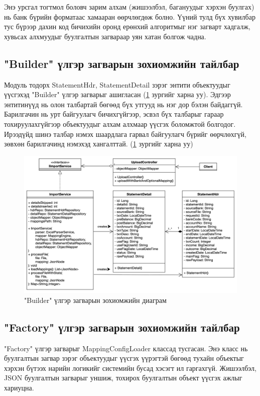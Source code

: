Энэ урсгал тогтмол боловч зарим алхам (жишээлбэл, багануудыг хэрхэн буулгах) нь банк бүрийн форматаас хамааран өөрчлөгдөж болно. Үүний тулд бүх хувилбар тус бүрээр дахин код бичихийн оронд ерөнхий алгоритмыг нэг загварт хадгалж, хувьсах алхмуудыг буулгалтын загвараар уян хатан болгож чадна. 

\subsection{"Builder" үлгэр загварын зохиомжийн тайлбар}

Модуль тодорх StatementHdr, StatementDetail зэрэг энтити объектуудыг үүсгэхэд "Builder" үлгэр загварыг ашигласан (\ref{fig:builder} зургийг харна уу). Эдгээр энтитинүүд нь олон талбартай бөгөөд бүх утгууд нь нэг дор бэлэн байдаггүй. Барилгачин нь урт байгуулагч бичихгүйгээр, эсвэл бүх талбарыг гараар тохируулахгүйгээр объектуудыг алхам алхмаар үүсгэх боломжтой болгодог. Ирээдүйд шинэ талбар нэмэх шаардлага гарвал байгуулагч бүрийг өөрчлөхгүй, зөвхөн барилгачинд нэмэхэд хангалттай. (\ref{fig:builder} зургийг харна уу)
\begin{figure}[H]
		\centering
		\includegraphics[width=15cm]{images/builder.png}
		\caption{"Builder" үлгэр загварын зохиомжийн диаграм}
		\label{fig:builder}
\end{figure}

\subsection{"Factory" үлгэр загварын зохиомжийн тайлбар}

"Factory" үлгэр загварыг MappingConfigLoader классад тусгасан. Энэ класс нь буулгалтын загвар зэрэг объектуудыг үүсгэх үүрэгтэй бөгөөд тухайн объектыг хэрхэн бүтээх нарийн логикийг системийн бусад хэсэгт ил гаргахгүй. Жишээлбэл, JSON буулгалтын загварыг уншиж, тохирох буулгалтын объект үүсгэх ажлыг хариуцна.

